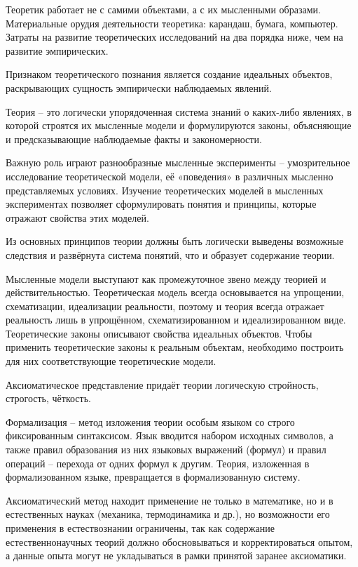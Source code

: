 \documentclass[exam_answers.tex]{subfiles}
\begin{document}
\renewcommand{\baselinestretch}{0.75}

Теоретик работает не с самими объектами, а с их мысленными образами.
Материальные орудия деятельности теоретика: карандаш, бумага, компьютер.
Затраты на развитие теоретических исследований на два порядка ниже, чем на развитие эмпирических.

Признаком теоретического познания является создание идеальных объектов, раскрывающих сущность эмпирически наблюдаемых явлений.

Теория – это логически упорядоченная система знаний о каких-либо явлениях, в которой строятся их мысленные модели и формулируются законы, объясняющие и предсказывающие наблюдаемые факты и закономерности.

Важную роль играют разнообразные мысленные эксперименты – умозрительное исследование теоретической модели, её «поведения» в различных мысленно представляемых условиях.
Изучение теоретических моделей в мысленных экспериментах позволяет сформулировать понятия и принципы, которые отражают свойства этих моделей.

Из основных принципов теории должны быть логически выведены возможные следствия и развёрнута система понятий, что и образует содержание теории.

Мысленные модели выступают как промежуточное звено между теорией и действительностью.
Теоретическая модель всегда основывается на упрощении, схематизации, идеализации реальности, поэтому и теория всегда отражает реальность лишь в упрощённом, схематизированном и идеализированном виде.
Теоретические законы описывают свойства идеальных объектов.
Чтобы применить теоретические законы к реальным объектам, необходимо построить для них соответствующие теоретические модели.

Аксиоматическое представление придаёт теории логическую стройность, строгость, чёткость.

Формализация – метод изложения теории особым языком со строго фиксированным синтаксисом.
Язык вводится набором исходных символов, а также правил образования из них языковых выражений (формул) и правил операций – перехода от одних формул к другим.
Теория, изложенная в формализованном языке, превращается в формализованную систему.

Аксиоматический метод находит применение не только в математике, но и в естественных науках (механика, термодинамика и др.), но возможности его применения в естествознании ограничены, так как содержание естественнонаучных теорий должно обосновываться и корректироваться опытом, а данные опыта могут не укладываться в рамки принятой заранее аксиоматики.
\end{document}
